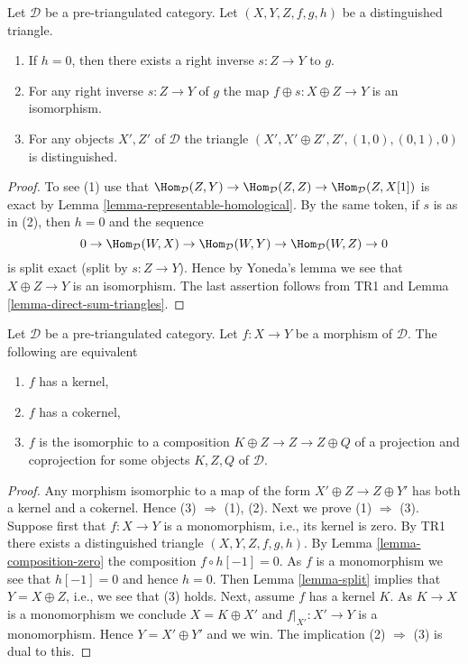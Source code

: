 \begin{lemma}
\label{lemma-split}
Let $\mathcal{D}$ be a pre-triangulated category.
Let $(X, Y, Z, f, g, h)$ be a distinguished triangle.
\begin{enumerate}
\item If $h = 0$, then there exists a right inverse $s : Z \to Y$ to $g$.
\item For any right inverse $s : Z \to Y$ of $g$ the map
$f \oplus s : X \oplus Z \to Y$ is an isomorphism.
\item For any objects $X', Z'$ of $\mathcal{D}$ the triangle
$(X', X' \oplus Z', Z', (1, 0), (0, 1), 0)$ is distinguished.
\end{enumerate}
\end{lemma}

\begin{proof}
To see (1) use that
$\Hom_\mathcal{D}(Z, Y) \to \Hom_\mathcal{D}(Z, Z) \to
\Hom_\mathcal{D}(Z, X[1])$
is exact by
Lemma \ref{lemma-representable-homological}.
By the same token, if $s$ is as in (2), then $h = 0$ and the sequence
$$
0 \to \Hom_\mathcal{D}(W, X) \to \Hom_\mathcal{D}(W, Y)
\to \Hom_\mathcal{D}(W, Z) \to 0
$$
is split exact (split by $s : Z \to Y$). Hence by Yoneda's lemma we
see that $X \oplus Z \to Y$ is an isomorphism. The last assertion follows
from TR1 and
Lemma \ref{lemma-direct-sum-triangles}.
\end{proof}

\begin{lemma}
\label{lemma-when-split}
Let $\mathcal{D}$ be a pre-triangulated category.
Let $f : X \to Y$ be a morphism of $\mathcal{D}$.
The following are equivalent
\begin{enumerate}
\item $f$ has a kernel,
\item $f$ has a cokernel,
\item $f$ is the isomorphic to a composition
$K \oplus Z \to Z \to Z \oplus Q$ of a projection and coprojection
for some objects $K, Z, Q$ of $\mathcal{D}$.
\end{enumerate}
\end{lemma}

\begin{proof}
Any morphism isomorphic to a map of the form
$X' \oplus Z \to Z \oplus Y'$ has both a kernel and a cokernel.
Hence (3) $\Rightarrow$ (1), (2).
Next we prove (1) $\Rightarrow$ (3).
Suppose first that $f : X \to Y$ is a monomorphism, i.e., its kernel is zero.
By TR1 there exists a distinguished triangle $(X, Y, Z, f, g, h)$.
By Lemma \ref{lemma-composition-zero} the composition
$f \circ h[-1] = 0$. As $f$ is a monomorphism we see that $h[-1] = 0$
and hence $h = 0$. Then
Lemma \ref{lemma-split}
implies that $Y = X \oplus Z$, i.e., we see that (3) holds.
Next, assume $f$ has a kernel $K$. As $K \to X$ is a monomorphism we
conclude $X = K \oplus X'$ and $f|_{X'} : X' \to Y$ is a monomorphism.
Hence $Y = X' \oplus Y'$ and we win.
The implication (2) $\Rightarrow$ (3) is dual to this.
\end{proof}

